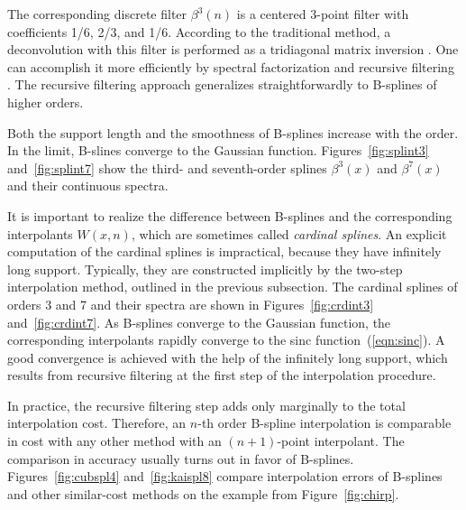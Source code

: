 The corresponding discrete filter $\beta^3(n)$ is a centered 3-point
filter with coefficients 1/6, 2/3, and 1/6. According to the
traditional method, a deconvolution with this filter is performed as a
tridiagonal matrix inversion \cite[]{deBoor}. One can accomplish it more
efficiently by spectral factorization and recursive filtering
\cite[]{unser1}. The recursive filtering approach generalizes
straightforwardly to B-splines of higher orders.
\par
Both the support length and the smoothness of B-splines increase with
the order. In the limit, B-slines converge to the Gaussian function.
Figures~\ref{fig:splint3} and~\ref{fig:splint7} show the third- and
seventh-order splines $\beta^3(x)$ and $\beta^7(x)$ and their
continuous spectra.



\par
It is important to realize the difference between B-splines and the
corresponding interpolants $W(x,n)$, which are sometimes called
\emph{cardinal splines}.  An explicit computation of the cardinal
splines is impractical, because they have infinitely long support.
Typically, they are constructed implicitly by the two-step
interpolation method, outlined in the previous subsection. The
cardinal splines of orders 3 and 7 and their spectra are shown in
Figures~\ref{fig:crdint3} and~\ref{fig:crdint7}. As B-splines converge
to the Gaussian function, the corresponding interpolants rapidly
converge to the sinc function~(\ref{eqn:sinc}). A good convergence
is achieved with the help of the infinitely long support, which
results from recursive filtering at the first step of the
interpolation procedure.


\par
{}
In practice, the recursive filtering step adds only marginally to the
total interpolation cost. Therefore, an $n$-th order B-spline
interpolation is comparable in cost with any other method with an
$(n+1)$-point interpolant. The comparison in accuracy usually turns
out in favor of B-splines. Figures~\ref{fig:cubspl4}
and~\ref{fig:kaispl8} compare interpolation errors of B-splines and
other similar-cost methods on the example from Figure~\ref{fig:chirp}.

